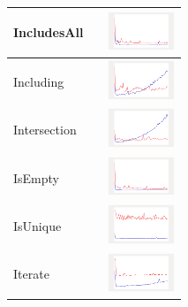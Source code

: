 \begin{longtable}{ m{2.5cm} m{8cm} m{2cm} }
IncludesAll &

&
\includegraphics[width=2cm]{../graphs/set/small/IncludesAll}
\\\hline

Including &

&
\includegraphics[width=2cm]{../graphs/set/small/Including}
\\\hline

Intersection &

&
\includegraphics[width=2cm]{../graphs/set/small/Intersection}
\\\hline

IsEmpty &

&
\includegraphics[width=2cm]{../graphs/set/small/IsEmpty}
\\\hline

IsUnique &

&
\includegraphics[width=2cm]{../graphs/set/small/isUnique}
\\\hline

Iterate &

&
\includegraphics[width=2cm]{../graphs/set/small/Iterate}
\\\hline


\end{longtable}
